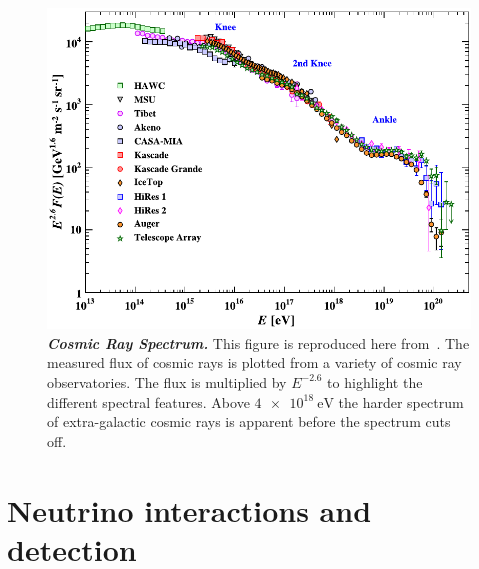 \begin{figure}
	\centering
	\includegraphics[width=0.8\linewidth]{figures/cosmic_ray_spectrum}
	\caption{\textbf{\textit{Cosmic Ray Spectrum.}}
		This figure is reproduced here from~\cite{PhysRevD.98.030001}.
		The measured flux of cosmic rays is plotted from a variety of cosmic ray observatories.
		The flux is multiplied by $E^{-2.6}$ to highlight the different spectral features.
		Above $\SI{4e18}\eV$ the harder spectrum of extra-galactic cosmic rays is apparent before the spectrum cuts off.
	}\label{fig:cosmic_ray_spectrum}
\end{figure}

\section{Neutrino interactions and detection}

